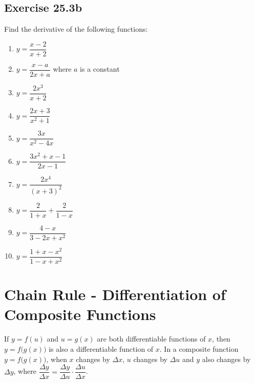 \documentclass[12pt]{report}
\begin{document}
\subsection{Exercise 25.3b}
\noindent Find the derivative of the following functions:
\setlength{\columnseprule}{1pt}
\setlength{\columnsep}{24pt}
\begin{multicols}{2}
  \begin{enumerate}
    \item $y={\dfrac{x-2}{x+2}}$
    \item $y={\dfrac{x-a}{2x+a}}$ where $a$ is a constant
    \item $y={\dfrac{2x^{3}}{x+2}}$
    \item $y={\dfrac{2x+3}{x^{2}+1}}$
    \item $y={\dfrac{3x}{x^{2}-4x}}$
    \item $y={\dfrac{3x^{2}+x-1}{2x-1}}$
    \item $y={\dfrac{2x^{4}}{{\left(x+3\right)}^{2}}}$
    \item $y={\dfrac{2}{1+x}}+{\dfrac{2}{1-x}}$
    \item $y={\dfrac{4-x}{3-2x+x^{2}}}$
    \item $y={\dfrac{1+x-x^{2}}{1-x+x^{2}}}$
  \end{enumerate}
\end{multicols}

\section{Chain Rule - Differentiation of Composite Functions}

If $y = f (u)$ and $u = g(x)$ are both differentiable functions of $x$, then $y
  = f\bigl(g(x)\bigr)$ is also a differentiable function of $x$. In a composite
function $y = f\bigl(g(x)\bigr)$, when $x$ changes by $\Delta x$, $u$ changes
by $\Delta u$ and $y$ also changes by $\Delta y$, where $\dfrac{\Delta
    y}{\Delta x} = \dfrac{\Delta y}{\Delta u} \cdot \dfrac{\Delta u}{\Delta x}$.
\end{document}
